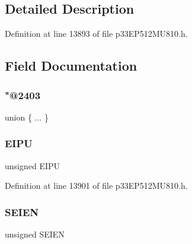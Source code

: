 \begin{DoxyCompactItemize}
\begin{tabbing}
\end{tabbing}\end{DoxyCompactItemize}


\subsection{Detailed Description}


Definition at line 13893 of file p33\+E\+P512\+M\+U810.\+h.



\subsection{Field Documentation}
\mbox{\label{structtag_s_t_c_o_n_b_i_t_s_a5881bbe77e8806234cd4d41565dac724}} 
\subsubsection{\texorpdfstring{"@2403}{@2403}}
{\footnotesize\ttfamily union \{ ... \} }

\mbox{\label{structtag_s_t_c_o_n_b_i_t_s_abbc746dab8c44ed4929f9cfd78dfb7fc}} 
\subsubsection{\texorpdfstring{E\+I\+PU}{EIPU}}
{\footnotesize\ttfamily unsigned E\+I\+PU}



Definition at line 13901 of file p33\+E\+P512\+M\+U810.\+h.

\mbox{\label{structtag_s_t_c_o_n_b_i_t_s_a6da1e1afed04bbca8b37c058fd690e64}} 
\subsubsection{\texorpdfstring{S\+E\+I\+EN}{SEIEN}}
{\footnotesize\ttfamily unsigned S\+E\+I\+EN}



